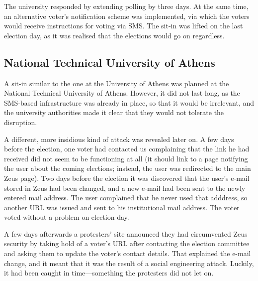 \documentclass[letterpaper,twocolumn,10pt]{article}
\begin{document}
The university responded by extending polling by three days. At the
same time, an alternative voter's notification scheme was implemented,
via which the voters would receive instructions for voting via SMS.
The sit-in was lifted on the last election day, as it was realised
that the elections would go on regardless.

\subsection{National Technical University of Athens}

A sit-in similar to the one at the University of Athens was planned at
the National Technical University of Athens. However, it did not last
long, as the SMS-based infrastructure was already in place, so that it
would be irrelevant, and the university authorities made it clear that
they would not tolerate the disruption.

A different, more insidious kind of attack was revealed later on. A
few days before the election, one voter had contacted us complaining
that the link he had received did not seem to be functioning at all
(it should link to a page notifying the user about the coming
elections; instead, the user was redirected to the main Zeus page).
Two days before the election it was discovered that the user's e-mail
stored in Zeus had been changed, and a new e-mail had been sent to the
newly entered mail address. The user complained that he never used
that adddress, so another URL was issued and sent to his institutional
mail address. The voter voted without a problem on election day.

A few days afterwards a protesters' site announced they had
circumvented Zeus security by taking hold of a voter's URL after
contacting the election committee and asking them to update the
voter's contact details. That explained the e-mail change, and it
meant that it was the result of a social engineering attack. Luckily,
it had been caught in time---something the protesters did not let on.
\end{document}
